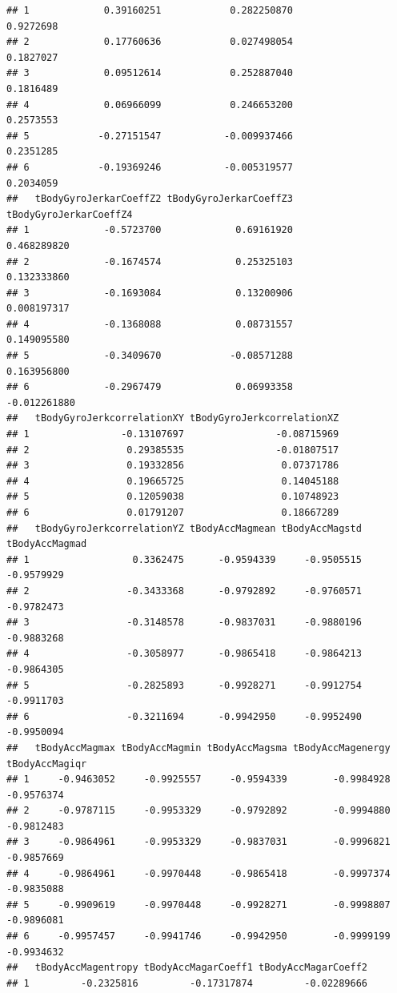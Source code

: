 \documentclass[
]{article}
\begin{document}
\begin{verbatim}
## 1             0.39160251            0.282250870              0.9272698
## 2             0.17760636            0.027498054              0.1827027
## 3             0.09512614            0.252887040              0.1816489
## 4             0.06966099            0.246653200              0.2573553
## 5            -0.27151547           -0.009937466              0.2351285
## 6            -0.19369246           -0.005319577              0.2034059
##   tBodyGyroJerkarCoeffZ2 tBodyGyroJerkarCoeffZ3 tBodyGyroJerkarCoeffZ4
## 1             -0.5723700             0.69161920            0.468289820
## 2             -0.1674574             0.25325103            0.132333860
## 3             -0.1693084             0.13200906            0.008197317
## 4             -0.1368088             0.08731557            0.149095580
## 5             -0.3409670            -0.08571288            0.163956800
## 6             -0.2967479             0.06993358           -0.012261880
##   tBodyGyroJerkcorrelationXY tBodyGyroJerkcorrelationXZ
## 1                -0.13107697                -0.08715969
## 2                 0.29385535                -0.01807517
## 3                 0.19332856                 0.07371786
## 4                 0.19665725                 0.14045188
## 5                 0.12059038                 0.10748923
## 6                 0.01791207                 0.18667289
##   tBodyGyroJerkcorrelationYZ tBodyAccMagmean tBodyAccMagstd tBodyAccMagmad
## 1                  0.3362475      -0.9594339     -0.9505515     -0.9579929
## 2                 -0.3433368      -0.9792892     -0.9760571     -0.9782473
## 3                 -0.3148578      -0.9837031     -0.9880196     -0.9883268
## 4                 -0.3058977      -0.9865418     -0.9864213     -0.9864305
## 5                 -0.2825893      -0.9928271     -0.9912754     -0.9911703
## 6                 -0.3211694      -0.9942950     -0.9952490     -0.9950094
##   tBodyAccMagmax tBodyAccMagmin tBodyAccMagsma tBodyAccMagenergy tBodyAccMagiqr
## 1     -0.9463052     -0.9925557     -0.9594339        -0.9984928     -0.9576374
## 2     -0.9787115     -0.9953329     -0.9792892        -0.9994880     -0.9812483
## 3     -0.9864961     -0.9953329     -0.9837031        -0.9996821     -0.9857669
## 4     -0.9864961     -0.9970448     -0.9865418        -0.9997374     -0.9835088
## 5     -0.9909619     -0.9970448     -0.9928271        -0.9998807     -0.9896081
## 6     -0.9957457     -0.9941746     -0.9942950        -0.9999199     -0.9934632
##   tBodyAccMagentropy tBodyAccMagarCoeff1 tBodyAccMagarCoeff2
## 1         -0.2325816         -0.17317874         -0.02289666

\end{verbatim}
\end{document}
